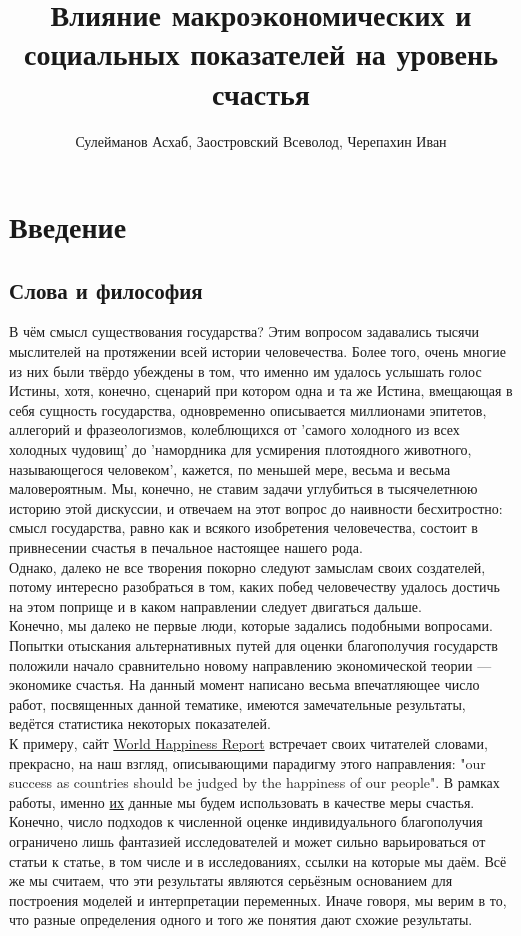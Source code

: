 \documentclass[russian]{vegareport}
\title{Влияние макроэкономических и социальных показателей на уровень счастья}
\author{Сулейманов Асхаб, Заостровский Всеволод, Черепахин Иван}
\date{}
\begin{document}
    \maketitle

    \chapter{Введение}
        \section{Слова и философия}
        В чём смысл существования государства? Этим вопросом задавались тысячи мыслителей на протяжении всей истории человечества. Более того, очень многие из них были твёрдо убеждены в том, что именно им удалось услышать голос Истины, хотя, конечно, сценарий при котором одна и та же Истина, вмещающая в себя сущность государства, одновременно описывается миллионами эпитетов, аллегорий и фразеологизмов, колеблющихся от 'самого холодного из всех холодных чудовищ' до 'намордника для усмирения плотоядного животного, называющегося человеком', кажется, по меньшей мере, весьма и весьма маловероятным. Мы, конечно, не ставим задачи углубиться в тысячелетнюю историю этой дискуссии, и отвечаем на этот вопрос до наивности бесхитростно: смысл государства, равно как и всякого изобретения человечества, состоит в привнесении счастья в печальное настоящее нашего рода.
        \\
        Однако, далеко не все творения покорно следуют замыслам своих создателей, потому интересно разобраться в том, каких побед человечеству удалось достичь на этом поприще и в каком направлении следует двигаться дальше.
        \\
        Конечно, мы далеко не первые люди, которые задались подобными вопросами. Попытки отыскания альтернативных путей для оценки благополучия государств положили начало сравнительно новому направлению экономической теории --- экономике счастья. На данный момент написано весьма впечатляющее число работ, посвященных данной тематике, имеются замечательные результаты, ведётся статистика некоторых показателей.
        \\
        К примеру, сайт \href{https://worldhappiness.report/}{World Happiness Report} встречает своих читателей словами, прекрасно, на наш взгляд, описывающими парадигму этого направления: "our success as countries should be judged by the happiness of our people". В рамках работы, именно \href{https://www.kaggle.com/datasets/mathurinache/world-happiness-report-20152021?select=2016.csv}{их} данные мы будем использовать в качестве меры счастья. Конечно, число подходов к численной оценке индивидуального благополучия ограничено лишь фантазией исследователей и может сильно варьироваться от статьи к статье, в том числе и в исследованиях, ссылки на которые мы даём. Всё же мы считаем, что эти результаты являются серьёзным основанием для построения моделей и интерпретации переменных. Иначе говоря, мы верим в то, что разные определения одного и того же понятия дают схожие результаты.
\end{document}
